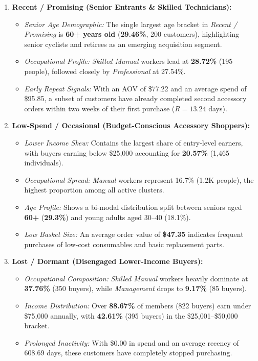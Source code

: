 \begin{enumerate}
    \item \textbf{Recent / Promising (Senior Entrants \& Skilled Technicians):}
    \begin{itemize}
        \item \textit{Senior Age Demographic:} The single largest age bracket in \textit{Recent / Promising} is \textbf{60+ years old} (\textbf{29.46\%}, 200 customers), highlighting senior cyclists and retirees as an emerging acquisition segment.
        \item \textit{Occupational Profile:} \textit{Skilled Manual} workers lead at \textbf{28.72\%} (195 people), followed closely by \textit{Professional} at 27.54\%.
        \item \textit{Early Repeat Signals:} With an AOV of \$77.22 and an average spend of \$95.85, a subset of customers have already completed second accessory orders within two weeks of their first purchase ($R = 13.24$ days).
    \end{itemize}

    \item \textbf{Low-Spend / Occasional (Budget-Conscious Accessory Shoppers):}
    \begin{itemize}
        \item \textit{Lower Income Skew:} Contains the largest share of entry-level earners, with buyers earning below \$25,000 accounting for \textbf{20.57\%} (1,465 individuals).
        \item \textit{Occupational Spread:} \textit{Manual} workers represent 16.7\% (1.2K people), the highest proportion among all active clusters.
        \item \textit{Age Profile:} Shows a bi-modal distribution split between seniors aged \textbf{60+} (\textbf{29.3\%}) and young adults aged 30--40 (18.1\%).
        \item \textit{Low Basket Size:} An average order value of \textbf{\$47.35} indicates frequent purchases of low-cost consumables and basic replacement parts.
    \end{itemize}

    \item \textbf{Lost / Dormant (Disengaged Lower-Income Buyers):}
    \begin{itemize}
        \item \textit{Occupational Composition:} \textit{Skilled Manual} workers heavily dominate at \textbf{37.76\%} (350 buyers), while \textit{Management} drops to \textbf{9.17\%} (85 buyers).
        \item \textit{Income Distribution:} Over \textbf{88.67\%} of members (822 buyers) earn under \$75,000 annually, with \textbf{42.61\%} (395 buyers) in the \$25,001--\$50,000 bracket.
        \item \textit{Prolonged Inactivity:} With \$0.00 in spend and an average recency of 608.69 days, these customers have completely stopped purchasing.
    \end{itemize}
\end{enumerate}

